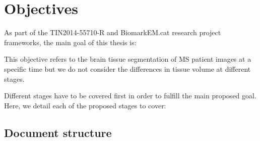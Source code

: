 \section{Objectives}
\label{sec: objectives}

As part of the TIN2014-55710-R and BiomarkEM.cat research project frameworks, the main goal of this thesis is: 

\begin{center}
\end{center}

\noindent This objective refers to the brain tissue segmentation of MS patient images at a specific time but we do not consider the differences in tissue volume at different stages. 

Different stages have to be covered first in order to fulfill the main proposed goal. Here, we detail each of the proposed stages to cover: 



\subsection{Document structure}
\label{sec:label}


